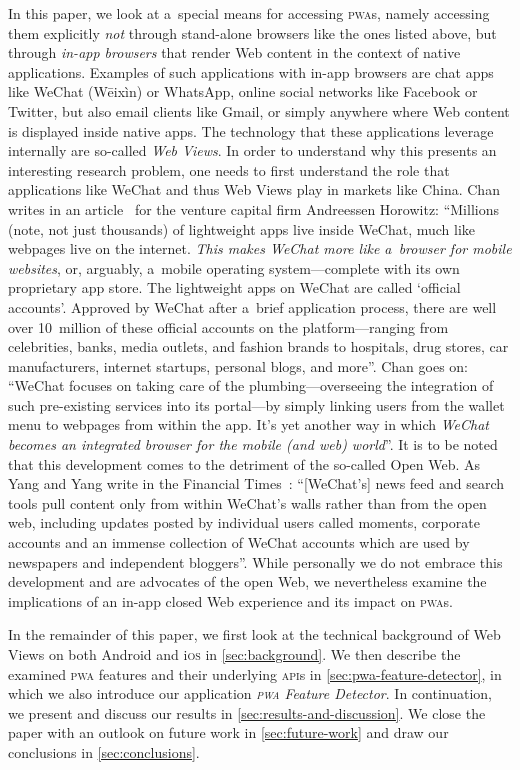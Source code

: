 \documentclass[sigconf]{acmart}
\begin{document}
In this paper, we look at a~special means for accessing \textsc{pwa}s,
namely accessing them explicitly \emph{not} through stand-alone browsers
like the ones listed above,
but through \emph{in-app browsers} that render Web content in the context of native applications.
Examples of such applications with in-app browsers are chat apps like WeChat (Wēixìn) or WhatsApp,
online social networks like Facebook or Twitter, but also email clients like Gmail,
or simply anywhere where Web content is displayed inside native apps.
The technology that these applications leverage internally are so-called \emph{Web Views}.
In order to understand why this presents an interesting research problem,
one needs to first understand the role that applications like WeChat
and thus Web Views play in markets like China.
Chan writes in an article~\cite{chan2015wechat} for the venture capital firm Andreessen Horowitz:
``Millions (note, not just thousands) of lightweight apps live inside WeChat,
much like webpages live on the internet.
\emph{This makes WeChat more like a~browser for mobile websites}, or, arguably,
a~mobile operating system---complete with its own proprietary app store.
The lightweight apps on WeChat are called `official accounts'.
Approved by WeChat after a~brief application process,
there are well over 10~million of these official accounts on the platform---ranging
from celebrities, banks, media outlets, and fashion brands to hospitals, drug stores,
car manufacturers, internet startups, personal blogs, and more''.
Chan goes on: ``WeChat focuses on taking care of the plumbing---overseeing
the integration of such pre-existing services into its portal---by
simply linking users from the wallet menu to webpages from within the app.
It's yet another way in which \emph{WeChat
becomes an integrated browser for the mobile (and web) world}''.
It is to be noted that this development comes to the detriment of the so-called Open Web.
As Yang and Yang write in the Financial Times~\cite{yang2017tencent}:
``[WeChat's] news feed and search tools pull content only from within WeChat's walls
rather than from the open web, including updates posted by individual users called moments,
corporate accounts and an immense collection of WeChat accounts
which are used by newspapers and independent bloggers''.
While personally we do not embrace this development
and are advocates of the open Web,
we nevertheless examine the implications of an in-app closed Web experience
and its impact on \textsc{pwa}s. 

In the remainder of this paper, we first look at the technical background of Web Views
on both Android and i\textsc{os} in \autoref{sec:background}.
We then describe the examined \textsc{pwa} features and their underlying \textsc{api}s
in \autoref{sec:pwa-feature-detector}, in which we also introduce
our application \emph{\textsc{pwa} Feature Detector}.
In continuation, we present and discuss our results in \autoref{sec:results-and-discussion}.
We close the paper with an outlook on future work in \autoref{sec:future-work}
and draw our conclusions in \autoref{sec:conclusions}.
\end{document}

